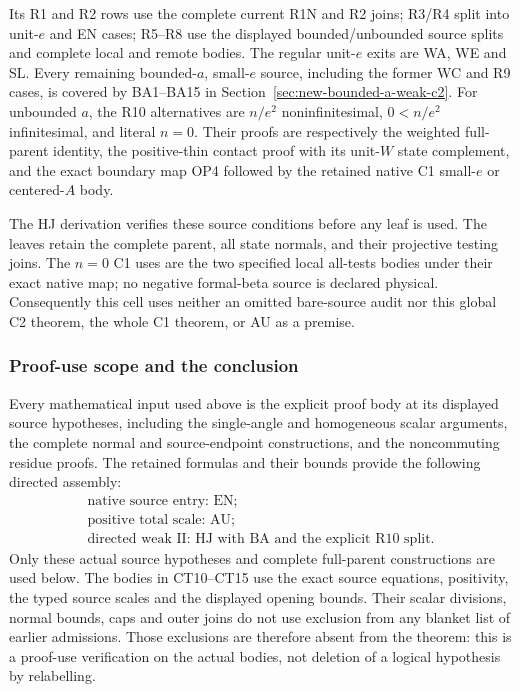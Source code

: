 Its R1 and R2 rows use the complete current R1N and R2 joins;
R3/R4 split into unit-\(e\) and EN cases; R5--R8 use the displayed
bounded/unbounded source splits and complete local and remote bodies.
The regular unit-\(e\) exits are WA, WE and SL. Every remaining
bounded-\(a\), small-\(e\) source, including the former WC and R9
cases, is covered by BA1--BA15 in
Section~\ref{sec:new-bounded-a-weak-c2}.
For unbounded \(a\), the R10 alternatives are
\(n/e^2\) noninfinitesimal, \(0<n/e^2\) infinitesimal, and literal
\(n=0\). Their proofs are respectively the weighted full-parent
identity, the positive-thin contact proof with its unit-\(W\) state
complement, and the exact boundary map OP4 followed by the retained
native C1 small-\(e\) or centered-\(A\) body.

The HJ derivation verifies these source conditions before any leaf
is used. The leaves retain the complete parent, all state normals,
and their projective testing joins. The \(n=0\) C1 uses are the two
specified local all-tests bodies under their exact native map;
no negative formal-beta source is declared physical. Consequently
this cell uses neither an omitted bare-source audit nor this global
C2 theorem, the whole C1 theorem, or AU as a premise.

\subsubsection*{Proof-use scope and the conclusion}

Every mathematical input used above is the explicit proof body at
its displayed source hypotheses, including the single-angle and
homogeneous scalar arguments, the complete normal and source-endpoint
constructions, and the noncommuting residue proofs. The retained
formulas and their bounds provide the following directed assembly:
\[
\begin{gathered}
 \text{native source entry: EN;}\\
 \text{positive total scale: AU;}\\
 \text{directed weak II: HJ with BA and the explicit R10 split.}
\end{gathered}\tag{CT16}
\]
Only these actual source hypotheses and complete full-parent
constructions are used below.
The bodies in CT10--CT15 use the exact source equations,
positivity, the typed source scales and the displayed
opening bounds.  Their scalar divisions, normal bounds,
caps and outer joins do not use exclusion from any
blanket list of earlier admissions.
Those exclusions are therefore absent from the theorem:
this is a proof-use verification on the actual bodies,
not deletion of a logical hypothesis by relabelling.

